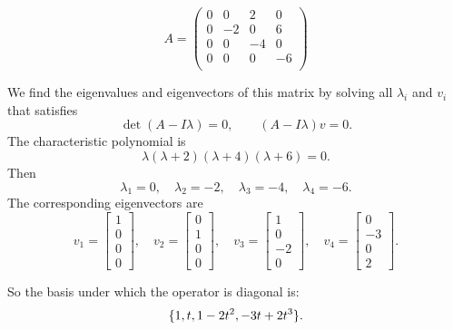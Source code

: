 \begin{solution}
\begin{enumerate}[(a)]
		 \[ A = \begin{pmatrix}
		 	0 & 0 & 2 & 0 \\
		 	0 & -2 & 0 & 6 \\
		 	0 & 0 & -4 & 0 \\
		 	0 & 0 & 0 & -6 \\
		 \end{pmatrix} \]
		 
		 We find the eigenvalues and eigenvectors of this matrix by solving all $ \lambda_i $ and $ v_i $ that satisfies
		 \[ \det(A -I \lambda) = 0, \qquad (A-I\lambda)v = 0. \]
		 The characteristic polynomial is
		 \[ \lambda(\lambda+2)(\lambda+4)(\lambda+6) = 0. \]
		 Then
		 \[ \lambda_1 = 0, \quad \lambda_2 = -2,\quad \lambda_3 = -4,\quad \lambda_4 = -6. \]
		 The corresponding eigenvectors are
		 \[
		 v_1 =
		 \begin{bmatrix}
		 	1 \\ 0 \\ 0 \\ 0
		 \end{bmatrix},
		 \quad
		 v_2 =
		 \begin{bmatrix}
		 	0 \\ 1 \\ 0 \\ 0
		 \end{bmatrix},
		 \quad
		 v_3 =
		 \begin{bmatrix}
		 	1 \\ 0 \\ -2 \\ 0
		 \end{bmatrix},
		 \quad
		 v_4 =
		 \begin{bmatrix}
		 	0 \\ -3 \\ 0 \\ 2
		 \end{bmatrix}.
		 \]
		 
		 So the basis under which the operator is diagonal is:
		 \[ \{1,t,1-2t^2, -3t+2t^3\}. \]
	\end{enumerate}
\end{solution}



